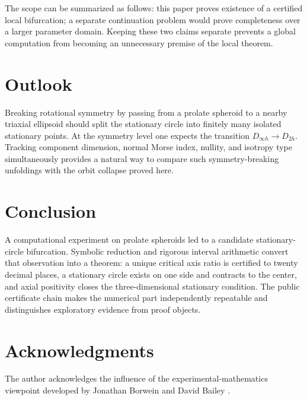 \documentclass[11pt]{article}
\begin{document}
The scope can be summarized as follows: this paper proves existence of a certified local bifurcation; a separate continuation problem would prove completeness over a larger parameter domain. Keeping these two claims separate prevents a global computation from becoming an unnecessary premise of the local theorem.

\section{Outlook}
Breaking rotational symmetry by passing from a prolate spheroid to a nearby triaxial ellipsoid should split the stationary circle into finitely many isolated stationary points. At the symmetry level one expects the transition $D_{\infty h}\to D_{2h}$. Tracking component dimension, normal Morse index, nullity, and isotropy type simultaneously provides a natural way to compare such symmetry-breaking unfoldings with the orbit collapse proved here.

\section{Conclusion}
A computational experiment on prolate spheroids led to a candidate stationary-circle bifurcation. Symbolic reduction and rigorous interval arithmetic convert that observation into a theorem: a unique critical axis ratio is certified to twenty decimal places, a stationary circle exists on one side and contracts to the center, and axial positivity closes the three-dimensional stationary condition. The public certificate chain makes the numerical part independently repeatable and distinguishes exploratory evidence from proof objects.

\section*{Acknowledgments}
The author acknowledges the influence of the experimental-mathematics viewpoint developed by Jonathan Borwein and David Bailey \cite{BorweinBailey}.

\appendix
\end{document}
